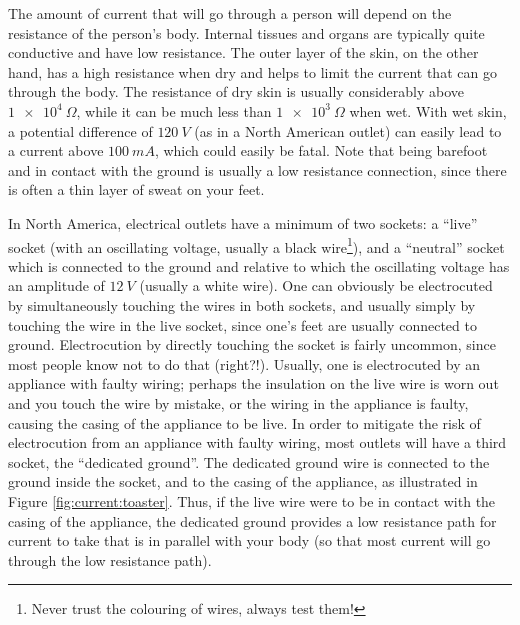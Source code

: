 The amount of current that will go through a person will depend on the resistance of the person's body. Internal tissues and organs are typically quite conductive and have low resistance. The outer layer of the skin, on the other hand, has a high resistance when dry and helps to limit the current that can go through the body. The resistance of dry skin is usually considerably above $\SI{1e4}{\Omega}$, while it can be much less than $\SI{1e3}{\Omega}$ when wet. With wet skin, a potential difference of $\SI{120}{V}$ (as in a North American outlet) can easily lead to a current above $\SI{100}{mA}$, which could easily be fatal. Note that being barefoot and in contact with the ground is usually a low resistance connection, since there is often a thin layer of sweat on your feet.

In North America, electrical outlets have a minimum of two sockets: a ``live'' socket (with an oscillating voltage, usually a black wire\footnote{Never trust the colouring of wires, always test them!}), and a ``neutral'' socket which is connected to the ground and relative to which the oscillating voltage has an amplitude of $\SI{12}{V}$ (usually a white wire). One can obviously be electrocuted by simultaneously touching the wires in both sockets, and usually simply by touching the wire in the live socket, since one's feet are usually connected to ground. Electrocution by directly touching the socket is fairly uncommon, since most people know not to do that (right?!). Usually, one is electrocuted by an appliance with faulty wiring; perhaps the insulation on the live wire is worn out and you touch the wire by mistake, or the wiring in the appliance is faulty, causing the casing of the appliance to be live. In order to mitigate the risk of electrocution from an appliance with faulty wiring, most outlets will have a third socket, the ``dedicated ground''. The dedicated ground wire is connected to the ground inside the socket, and to the casing of the appliance, as illustrated in Figure \ref{fig:current:toaster}. Thus, if the live wire were to be in contact with the casing of the appliance, the dedicated ground provides a low resistance path for current to take that is in parallel with your body (so that most current will go through the low resistance path). 

